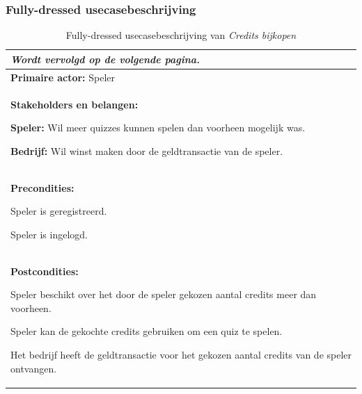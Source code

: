 \subsubsection{Fully-dressed usecasebeschrijving}
\begin{xltabular}{\textwidth}{X}
   \caption{Fully-dressed usecasebeschrijving van \textit{Credits bijkopen}} \label{tab:usecasecreditsbijkopen} \\ \hline \endfirsthead\endhead
   \hspace*{\fill}\textit{Wordt vervolgd op de volgende pagina.} \\ \hline \endfoot\endlastfoot

   \textbf{Primaire actor:} Speler                  \\

   \hline

   \begin{minipage}[t]{\linewidth}
      \textbf{Stakeholders en belangen:}
      \begin{smallitemize}
         \item \textbf{Speler:} Wil meer quizzes kunnen spelen dan voorheen mogelijk was.
         \item \textbf{Bedrijf:} Wil winst maken door de geldtransactie van de speler.
      \end{smallitemize}
   \end{minipage} \\

   \hline

   \begin{minipage}[t]{\linewidth}
      \textbf{Precondities:}
      \begin{smallitemize}
         \item Speler is geregistreerd.
         \item Speler is ingelogd.
      \end{smallitemize}
   \end{minipage} \\

   \hline

   \begin{minipage}[t]{\linewidth}
      \textbf{Postcondities:}
      \begin{smallitemize}
         \item Speler beschikt over het door de speler gekozen aantal credits meer dan voorheen.
         \item Speler kan de gekochte credits gebruiken om een quiz te spelen.
         \item Het bedrijf heeft de geldtransactie voor het gekozen aantal credits van de speler ontvangen.
      \end{smallitemize}
   \end{minipage} \\


\end{xltabular}
